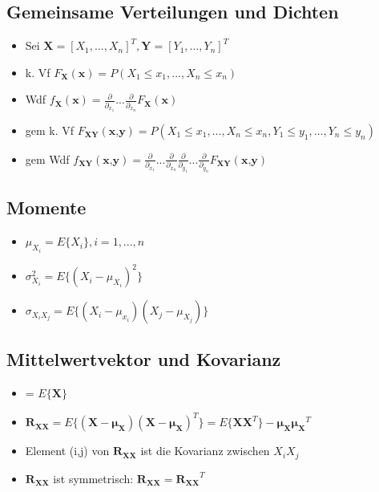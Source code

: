 \documentclass{article}
\begin{document}
\subsection{Gemeinsame Verteilungen und Dichten}
\begin{itemize}
\item Sei $\textbf{X} = [X_1, ..., X_n]^T, \textbf{Y} = [Y_1, ..., Y_n]^T$
\item  k. Vf $F_\textbf{X}(\textbf{x}) = P(X_1 \leq x_1, ..., X_n \leq x_n) $
\item  Wdf $f_\textbf{X}(\textbf{x}) = \frac{\partial}{\partial_{x_1}} ... \frac{\partial}{\partial_{x_n}} F_\textbf{X}(\textbf{x})$
\item gem  k. Vf $F_\textbf{XY}(\textbf{x,y}) = P(X_1 \leq x_1, ..., X_n \leq x_n, Y_1 \leq y_1, ..., Y_n \leq y_n) $
\item gem Wdf $f_\textbf{XY}(\textbf{x,y}) = \frac{\partial}{\partial_{x_1}} ... \frac{\partial}{\partial_{x_n}} \frac{\partial}{\partial_{y_1}} ... \frac{\partial}{\partial_{y_n}}F_\textbf{XY}(\textbf{x,y})$
\end{itemize}

\subsection{Momente}
\begin{itemize}
\item $\mu_{X_i} = E\{X_i\}, i = 1, ...,n$
\item $\sigma_{X_i}^2 = E\{(X_i - \mu_{X_i})^2 \}$
\item $\sigma_{X_i X_j} = E\{ (X_i-\mu_{x_i})(X_j-\mu_{X_j})\}$
\end{itemize}

\subsection{Mittelwertvektor und Kovarianz}
\begin{itemize}
\item  {} = $E \{ \bm{X} \} $
\item $\bm{R_{XX}} = E\{(\bm{X}- \bm{\mu_X})(\bm{X}- \bm{\mu_X})^T  \} = E\{\bm{XX}^T \}-\bm{\mu_X\mu_X}^T$
\item Element (i,j) von $\bm{R_{XX}}$ ist die Kovarianz zwischen $X_i X_j$
\item $\bm{R_{XX}}$ ist symmetrisch: $\bm{R_{XX}} = \bm{R_{XX}}^T$
\end{itemize}
\end{document}
